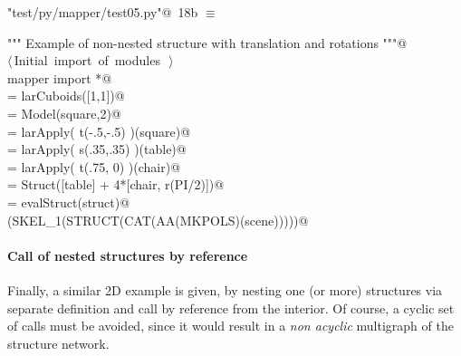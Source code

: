 \documentclass[11pt,oneside]{article}	%
\begin{document}
\begin{flushleft} \small \label{scrap34}
\protect{}\verb@"test/py/mapper/test05.py"@\nobreak\ {\footnotesize 18b }$\equiv$
\vspace{-1ex}
\begin{list}{}{} \item
\mbox{}\verb@""" Example of non-nested structure with translation and rotations """@\\
\mbox{}\verb@@\hbox{$\langle\,$Initial import of modules\nobreak\ {\footnotesize {}}$\,\rangle$}\verb@@\\
\mbox{}\verb@from mapper import *@\\
\mbox{}\verb@square = larCuboids([1,1])@\\
\mbox{}\verb@square = Model(square,2)@\\
\mbox{}\verb@table = larApply( t(-.5,-.5) )(square)@\\
\mbox{}\verb@chair = larApply( s(.35,.35) )(table)@\\
\mbox{}\verb@chair = larApply( t(.75, 0) )(chair)@\\
\mbox{}\verb@struct = Struct([table] + 4*[chair, r(PI/2)])@\\
\mbox{}\verb@scene = evalStruct(struct)@\\
\mbox{}\verb@VIEW(SKEL_1(STRUCT(CAT(AA(MKPOLS)(scene)))))@\\
\mbox{}\verb@@{\NWsep}
\end{list}
\vspace{-2ex}
\end{flushleft}

\paragraph{Call of nested structures by reference}
Finally, a similar 2D example is given, by nesting one (or more) structures via separate definition and call by reference from the interior. Of course, a cyclic set of calls must be avoided, since it would result in a \emph{non acyclic} multigraph of the structure network.
\end{document}
